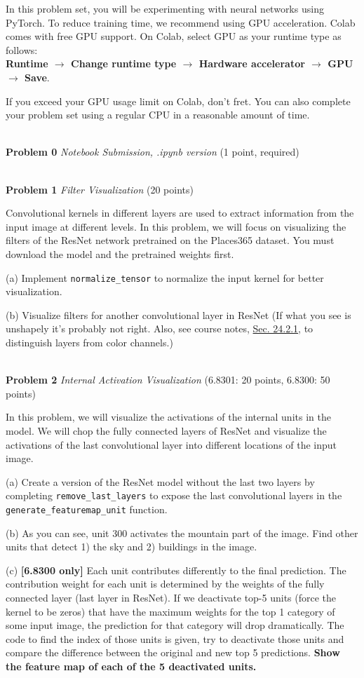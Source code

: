 \documentclass[11pt]{article}
\newcommand{\hwproblem}[2] {\noindent \\ {\bf #1} {\it #2}}
\begin{document}
\vspace{0.1cm}

In this problem set, you will be experimenting with neural networks using PyTorch. To reduce training time, we recommend using GPU acceleration. Colab comes with free GPU support. On Colab, select GPU as your runtime type as follows:\\
\textbf{Runtime $\rightarrow$ Change runtime type $\rightarrow$ Hardware accelerator $\rightarrow$ GPU $\rightarrow$ Save}. 


If you exceed your GPU usage limit on Colab, don't fret. You can also complete your problem set using a regular CPU in a reasonable amount of time. 

\hwproblem{Problem 0}{Notebook Submission, .ipynb version} (1 point, required)

\hwproblem{Problem 1}{Filter Visualization} (20 points)

Convolutional kernels in different layers are used to extract information from the input image at different levels. In this problem, we will focus on visualizing the filters of the ResNet network pretrained on the Places365 dataset. You must download the model and the pretrained weights first. 

(a) Implement \texttt{normalize\_tensor} to normalize the input kernel for better visualization. 

(b) Visualize filters for another convolutional layer in ResNet (If what you see is unshapely it's probably not right. Also, see course notes, \href{https://canvas.mit.edu/files/4059875/download?download_frd=1}{Sec. 24.2.1}, to distinguish layers from color channels.)

\hwproblem{Problem 2}{Internal Activation Visualization} (6.8301: 20 points, 6.8300: 50 points)

In this problem, we will visualize the activations of the internal units in the model. We will chop the fully connected layers of ResNet and visualize the activations of the last convolutional layer into different locations of the input image. 

(a) Create a version of the ResNet model without the last two layers by completing \texttt{remove\_last\_layers} to expose the last convolutional layers in the \texttt{generate\_featuremap\_unit} function. 

(b) As you can see,  unit 300 activates the mountain part of the image. Find other units that detect 1) the sky and 2) buildings in the image.

(c) \textbf{[6.8300 only]}  Each unit contributes differently to the final prediction. The contribution weight for each unit is determined by the weights of the fully connected layer (last layer in ResNet). If we deactivate top-5 units (force the kernel to be zeros) that have the maximum weights for the top 1 category of some input image, the prediction for that category will drop dramatically. The code to find the index of those units is given, try to deactivate those units and compare the difference between the original and new top 5 predictions. \textbf{Show the feature map of each of the 5 deactivated units. }
\end{document}

